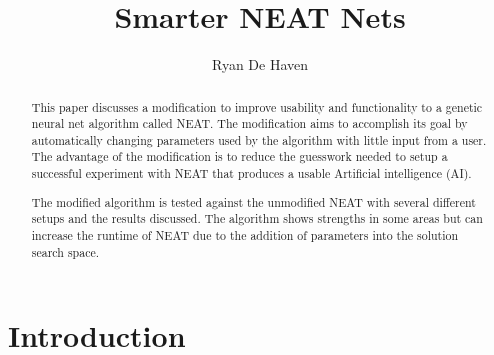\documentclass[12pt]{ucthesis} \newif\ifpdf \ifx\pdfoutput\undefined
\begin{document}
\title{Smarter NEAT Nets}

\author{Ryan De Haven}
  
 
 \chair{} \othermemberA{} \othermemberB{}   


\maketitle

\begin{frontmatter}

\copyrightpage

\approvalpage

 
\begin{abstract}
This paper discusses a modification to improve usability and functionality to a
genetic neural net algorithm called NEAT. The modification aims to accomplish
its goal by automatically changing parameters used by the algorithm with little
input from a user. The advantage of the modification is to reduce the guesswork
needed to setup a successful experiment with NEAT that produces a usable
Artificial intelligence (AI).

The modified algorithm is tested against the unmodified NEAT with several
different setups and the results discussed. The algorithm shows strengths in some areas
but can increase the runtime of NEAT due to the addition of parameters into the
solution search space.

\end{abstract}

\begin{acknowledgements}

\end{acknowledgements}

\tableofcontents

\listoftables

\listoffigures

\end{frontmatter}

\pagestyle{plain}

\renewcommand{\baselinestretch}{1.66}


\chapter{Introduction}
\end{document}
